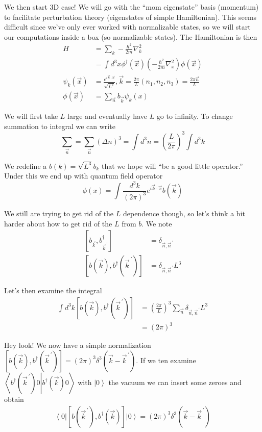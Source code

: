 \documentclass[10pt]{report}
\newcommand{\bra}[1]{\left<#1\right|}
\newcommand{\ket}[1]{\left|#1\right>}
\newcommand{\dotp}[2]{\left<#1\left.\right|#2\right>}
\newcommand{\pvec}[1]{\vec{#1}^{\,\prime}}
\begin{document}
We then start 3D case! We will go with the ``mom eigenstate'' basis (momentum) to facilitate perturbation theory (eigenstates of simple Hamiltonian). This seems difficult since we've only ever worked with normalizable states, so we will start our computations inside a box (so normalizable states). The Hamiltonian is then
\begin{align}
    H &= \sum_{k}^{}-\frac{\hbar^2}{2m}\nabla ^2_k\\
    &= \int d^3x \phi^\dagger(\vec{x}) \left( -\frac{\hbar^2}{2m}\nabla ^2_x \right)\phi(\vec{x})\\
    \psi_k(\vec{x}) &= \frac{e^{i\vec{k}\cdot \vec{x}}}{\sqrt{L^3}}, \vec{k} = \frac{2\pi}{L}(n_1, n_2, n_3) = \frac{2\pi \vec{n}}{L}\\
    \phi(\vec{x}) &= \sum_{\vec{n}}^{}b_{\vec{k}}\psi_k(x)
\end{align}

We will first take $L$ large and eventually have $L$ go to infinity. To change summation to integral we can write
\begin{equation}
    \sum_{\vec{n}}^{} = \sum_{\vec{n}}^{}\left( \Delta n \right)^3 = \int d^3n = \left( \frac{L}{2\pi} \right)^3\int d^3k
\end{equation}

We redefine a $b(k) = \sqrt{L^3}b_k$ that we hope will ``be a good little operator.'' Under this we end up with quantum field operator
\begin{equation}
    \phi(x) = \int \frac{d^3k}{(2\pi)^3}e^{i\vec{k}\cdot \vec{x}}b(\vec{k})
\end{equation}

We still are trying to get rid of the $L$ dependence though, so let's think a bit harder about how to get rid of the $L$ from $b$. We note
\begin{align}
    \left[ b_{\vec{k}}, b^\dagger_{\pvec{k}} \right] &= \delta_{\vec{n}, \pvec{n}}\\
    \left[ b(\vec{k}), b^\dagger(\pvec{k}) \right] &= \delta_{\vec{n}, \pvec{n}}L^3
\end{align}

Let's then examine the integral
\begin{align}
    \int d^3k \left[ b(\vec{k}), b^\dagger(\pvec{k}) \right] &= \left( \frac{2\pi}{L} \right)^3\sum_{\vec{n}}^{}\delta_{\vec{n}, \pvec{n}}L^3\\
    &= (2\pi)^3
\end{align}

Hey look! We now have a simple normalization $\left[ b(\vec{k}), b^\dagger(\pvec{k}) \right] = (2\pi)^3\delta^3(\vec{k} - \pvec{k})$. If we ten examine $\dotp{b^\dagger(\pvec{k})0}{b^\dagger(\vec{k})0}$ with $\ket{0}$ the vacuum we can insert some zeroes and obtain
\begin{align}
    \bra{0}\left[ b(\pvec{k}), b^\dagger(\vec{k}) \right]\ket{0} = (2\pi)^3\delta^3(\vec{k} - \pvec{k})
\end{align}
\end{document}
